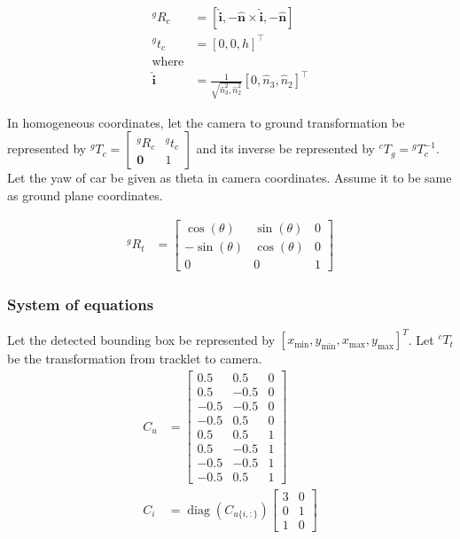\documentclass[10pt,twocolumn,letterpaper]{article}
\DeclareMathOperator{\diag}{diag}
\newcommand{\uv}[1]{\hat{\mathbf{#1}}}
\newcommand{\xymin}[1]{#1_{\text{min}}}
\newcommand{\xymax}[1]{#1_{\text{max}}}
\newcommand{\xmin}{\xymin{x}}
\newcommand{\xmax}{\xymax{x}}
\newcommand{\ymin}{\xymin{y}}
\newcommand{\ymax}{\xymax{y}}
\newcommand{\Tr}[3]{{}^{#1}{#2}_{#3}}
\begin{document}
\begin{align}
  ^gR_c &= [\uv{i}, -\uv{n} \times \uv{i}, -\uv{n}]\\
  ^gt_c &= [0, 0, h]^\top\\
        \text{where} & \\
 \uv{i} &= \frac{1}{\sqrt{\hat{n}^2_3, \hat{n}^2_2}}[0, \hat{n}_3, \hat{n}_2]^\top
\end{align}

In homogeneous coordinates, let the camera to ground transformation be
represented by $^gT_c = \begin{bmatrix}^gR_c & ^gt_c\\ \mathbf{0} &
1\end{bmatrix}$ and its inverse be represented by $^cT_g = {}^gT_c^{-1}$. Let
the yaw of car be given as theta in camera coordinates. Assume it to be same as
ground plane coordinates.

\begin{align}
  \Tr{g}{R}{t} &= \begin{bmatrix}
  \cos(\theta) & \sin(\theta) & 0 \\
 -\sin(\theta) & \cos(\theta) & 0 \\
             0 & 0 & 1
  \end{bmatrix}
\end{align}

\subsubsection{System of equations}
Let the detected bounding box be represented by $[\xmin, \ymin, \xmax, \ymax]^T$. Let $^cT_t$ be the transformation from tracklet to camera.
\newcommand{\Cu}{C_u}
\newcommand{\Cc}{C_c}
\begin{align}
  \Cu &= \begin{bmatrix}
    0.5 & 0.5 & 0\\
    0.5 & -0.5 & 0\\
    -0.5 & -0.5 & 0\\
    -0.5 & 0.5 & 0\\
    0.5 & 0.5 & 1\\
    0.5 & -0.5 & 1\\
    -0.5 & -0.5 & 1\\
    -0.5 & 0.5 & 1
  \end{bmatrix}\\
  C_i &= \diag( C_{u\{i,:\}} ) \begin{bmatrix}3& 0\\0 & 1 \\1 & 0\end{bmatrix} 
\end{align}
\end{document}
